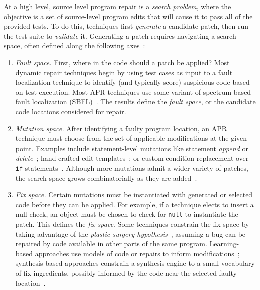 \documentclass[10pt,journal,compsoc]{IEEEtran}
\begin{document}
At a high level, source level program repair is a \emph{search problem}, where
the objective is a set of source-level program edits that will cause it to pass
all of the provided tests. To do this, techniques first \emph{generate} a candidate
patch, then run the test suite to \emph{validate} it. Generating a patch
requires navigating a search space, often defined along the
following axes~\cite{ae,sqjo}:
\begin{enumerate}[wide]

\item \emph{Fault space.} First, where 
  in the code should a patch be applied? Most dynamic repair
  techniques begin by using test cases as input to a fault localization
  technique to identify (and typically score) suspicious code
  based on test execution. Most APR techniques
  use some variant of spectrum-based fault localization (SBFL)~\cite{ochiai}. 
  The results define the \emph{fault space}, or the
  candidate code locations considered for repair.

\item \emph{Mutation space.} After identifying a faulty program location, an APR
  technique must choose from the set of applicable modifications at the given
  point. Examples include statement-level mutations like statement \emph{append}
  or \emph{delete}~\cite{genprog-operators}; hand-crafted edit
  templates~\cite{par}; or custom condition
  replacement over \texttt{if} statements~\cite{Xuan17}. Although more mutations
  admit a wider variety of patches, the search space grows combinatorially as
  they are added~\cite{long-search-spaces}.

\item \emph{Fix space.} Certain mutations must be instantiated with generated or
  selected code before they can be applied. For example, if a technique elects
  to insert a null check, an object must be chosen to check for 
  \texttt{null} to instantiate the patch. This defines
  the \emph{fix space}. Some techniques
  constrain the fix space by taking advantage of the \emph{plastic surgery
    hypothesis}~\cite{plastic}, assuming a bug can be repaired by code
  available in other parts of the same program. Learning-based
  approaches use models of code or repairs to inform
  modifications~\cite{prophet}; synthesis-based approaches constrain a
  synthesis engine to a small vocabulary of fix ingredients, possibly informed
  by the code near the selected faulty location~\cite{angelix,s3}.


\end{enumerate}
\end{document}
